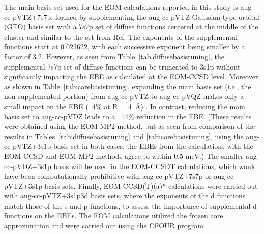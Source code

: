 The main basis set used for the EOM calculations reported in this study is aug-cc-pVTZ+7s7p, formed by supplementing the aug-cc-pVTZ Gaussian-type orbital (GTO) basis set\cite{10.1063/1.456153,10.1063/1.462569} with a 7s7p set of diffuse functions centered at the middle of the cluster and similar to the set from Ref.%
The exponents of the supplemental functions start at 0.023622, with each successive exponent being smaller by a factor of 3.2. 
However, as seen from Table~\ref{tab:diffusebasistuning}, the supplemental 7s7p set of diffuse functions can be truncated to 3s1p without significantly impacting the EBE as calculated at the EOM-CCSD level.
Moreover, as shown in Table~\ref{tab:corebasistuning}, expanding the main basis set (i.e., the non-supplemented portion) from aug-cc-pVTZ to aug-cc-pVQZ\cite{10.1063/1.456153,10.1063/1.462569} makes only a small impact on the EBE (~4\% at R = \SI{4}{\angstrom}) .
In contrast, reducing the main basis set to aug-cc-pVDZ\cite{10.1063/1.456153,10.1063/1.462569} leads to a ~14\% reduction in the EBE.
(These results were obtained using the EOM-MP2 method, but as seen from comparison of the results in Tables~\ref{tab:diffusebasistuning} and \ref{tab:corebasistuning}, using the aug-cc-pVTZ+3s1p basis set in both cases, the EBEs from the calculations with the EOM-CCSD and EOM-MP2 methods agree to within 0.5 meV.)
The smaller aug-cc-pVDZ+3s1p basis will be used in the EOM-CCSDT calculations, which would have been computationally prohibitive with aug-cc-pVTZ+7s7p or aug-cc-pVTZ+3s1p basis sets.
Finally, EOM-CCSD(T)(a)* calculations were carried out with aug-cc-pVTZ+3s1p3d basis sets, where the exponents of the d functions match those of the s and p functions, to assess the importance of supplemental d functions on the EBEs.
The EOM calculations utilized the frozen core approximation and were carried out using the CFOUR program.\cite{cfour,10.1063/5.0004837}%
